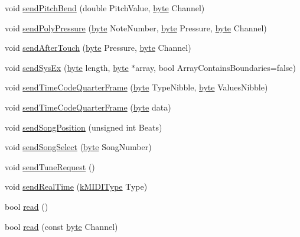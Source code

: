 \begin{CompactItemize}
\item 
void \hyperlink{class_m_i_d_i___class_16800e955a1d0d66e6bda6727588b1eb}{sendPitchBend} (double PitchValue, \hyperlink{_m_i_d_i_8h_b8ef12fab634c171394422d0ee8baf94}{byte} Channel)
\item 
void \hyperlink{class_m_i_d_i___class_028ec5a49dccf9c28b00e11e7a3d1d05}{sendPolyPressure} (\hyperlink{_m_i_d_i_8h_b8ef12fab634c171394422d0ee8baf94}{byte} NoteNumber, \hyperlink{_m_i_d_i_8h_b8ef12fab634c171394422d0ee8baf94}{byte} Pressure, \hyperlink{_m_i_d_i_8h_b8ef12fab634c171394422d0ee8baf94}{byte} Channel)
\item 
void \hyperlink{class_m_i_d_i___class_73b57f656a80166b98dc1b57ea9a56dc}{sendAfterTouch} (\hyperlink{_m_i_d_i_8h_b8ef12fab634c171394422d0ee8baf94}{byte} Pressure, \hyperlink{_m_i_d_i_8h_b8ef12fab634c171394422d0ee8baf94}{byte} Channel)
\item 
void \hyperlink{class_m_i_d_i___class_73a36cacf4e77ca081979f9c7066ee28}{sendSysEx} (\hyperlink{_m_i_d_i_8h_b8ef12fab634c171394422d0ee8baf94}{byte} length, \hyperlink{_m_i_d_i_8h_b8ef12fab634c171394422d0ee8baf94}{byte} $\ast$array, bool ArrayContainsBoundaries=false)
\item 
void \hyperlink{class_m_i_d_i___class_d9b1bd53330652f0360a0a6ed80b5b9d}{sendTimeCodeQuarterFrame} (\hyperlink{_m_i_d_i_8h_b8ef12fab634c171394422d0ee8baf94}{byte} TypeNibble, \hyperlink{_m_i_d_i_8h_b8ef12fab634c171394422d0ee8baf94}{byte} ValuesNibble)
\item 
void \hyperlink{class_m_i_d_i___class_1f720df72c5253d85d1d547d09357ea0}{sendTimeCodeQuarterFrame} (\hyperlink{_m_i_d_i_8h_b8ef12fab634c171394422d0ee8baf94}{byte} data)
\item 
void \hyperlink{class_m_i_d_i___class_0b9a6c3437016b8dc9678d6c43ca693f}{sendSongPosition} (unsigned int Beats)
\item 
void \hyperlink{class_m_i_d_i___class_0b957074192d439e8e69af9eef6fab77}{sendSongSelect} (\hyperlink{_m_i_d_i_8h_b8ef12fab634c171394422d0ee8baf94}{byte} SongNumber)
\item 
void \hyperlink{class_m_i_d_i___class_9d9a51ca4a888c7c4c0d91a9e678c751}{sendTuneRequest} ()
\item 
void \hyperlink{class_m_i_d_i___class_e9086dd31c41ea773925a069dbd0080b}{sendRealTime} (\hyperlink{_m_i_d_i_8h_802feb46a169642d43b2415d02390545}{kMIDIType} Type)
\item 
bool \hyperlink{class_m_i_d_i___class_8e7be5af3a32cb91f596dbb8d8c297bf}{read} ()
\item 
bool \hyperlink{class_m_i_d_i___class_581b5b973cd81e5aa9d6b91c220342b7}{read} (const \hyperlink{_m_i_d_i_8h_b8ef12fab634c171394422d0ee8baf94}{byte} Channel)

\end{CompactItemize}
